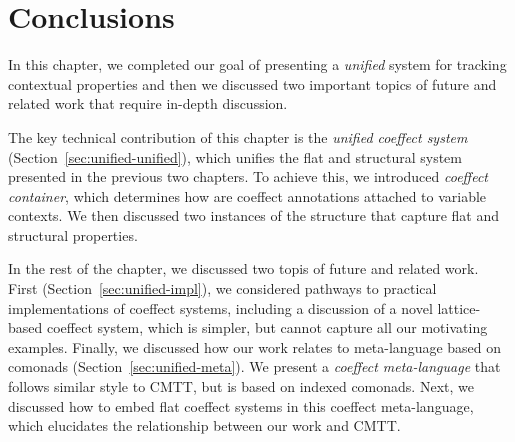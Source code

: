 %                                                                             
%                                                                             

\section{Conclusions}

In this chapter, we completed our goal of presenting a \emph{unified} system for tracking contextual
properties and then we discussed two important topics of future and related work that require 
in-depth discussion.

The key technical contribution of this chapter is the \emph{unified coeffect system} 
(Section~\ref{sec:unified-unified}), which unifies the flat and structural system presented
in the previous two chapters. To achieve this, we introduced \emph{coeffect container}, which
determines how are coeffect annotations attached to variable contexts. We then discussed two
instances of the structure that capture flat and structural properties.

In the rest of the chapter, we discussed two topis of future and related work. First
(Section~\ref{sec:unified-impl}), we considered pathways to practical implementations of
coeffect systems, including a discussion of a novel lattice-based coeffect system, which is simpler,
but cannot capture all our motivating examples. Finally, we discussed how our work relates to 
meta-language based on comonads (Section~\ref{sec:unified-meta}). We present a \emph{coeffect 
meta-language} that follows similar style to CMTT, but is based on indexed comonads. Next, we 
discussed how to embed flat coeffect systems in this coeffect meta-language, which elucidates the 
relationship between our work and CMTT. 